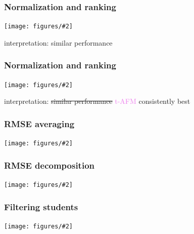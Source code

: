 \documentclass[bigger]{beamer}
\newcommand{\img}[2]{
  \begin{center}
    \texttt{[image: figures/\#2]}
  \end{center}
}
\begin{document}
\begin{frame}
  \frametitle{Normalization and ranking}
  \img{1.0}{RMSE-abs-rel-rank-partial}
  interpretation: similar performance
\end{frame}


\begin{frame}
  \frametitle{Normalization and ranking}
  \img{1.0}{RMSE-abs-rel-rank}
  interpretation: \sout{similar performance} \: \textcolor{violet}{t-AFM} consistently best


\end{frame}


%

\begin{frame}
  \frametitle{RMSE averaging}

  \img{0.8}{RMSE-averaging--Robot}

\end{frame}

\begin{frame}
  \frametitle{RMSE decomposition}
  \img{1.0}{RMSE-rank-per-level--Robot}

\end{frame}

\begin{frame}
  \frametitle{Filtering students}
  \img{1.0}{students-min-attempts--Robot}

\end{frame}
\end{document}
